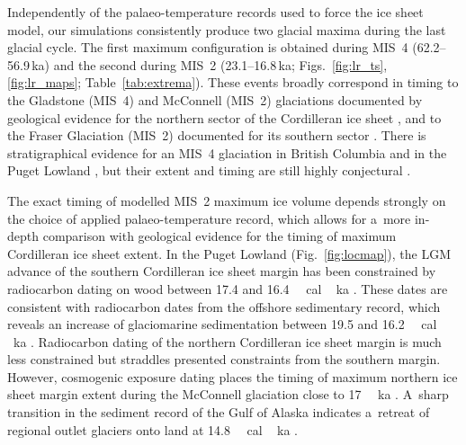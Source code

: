 \documentclass[tc, manuscript]{copernicus}
\begin{document}
      Independently of the palaeo-temperature records used to force the ice
      sheet model, our simulations consistently produce two glacial maxima
      during the last glacial cycle. The first maximum configuration is
      obtained during MIS~4 (62.2--56.9\,\unit{ka}) and the second during
      MIS~2 (23.1--16.8\,\unit{ka}; Figs.~\ref{fig:lr_ts},
      \ref{fig:lr_maps}; Table~\ref{tab:extrema}). These events broadly
      correspond in timing to the Gladstone (MIS~4) and McConnell (MIS~2)
      glaciations documented by geological evidence for the northern sector
      of the Cordilleran ice sheet \citep{Duk-Rodkin.etal.1996,
      Ward.etal.2007, Stroeven.etal.2010, Stroeven.etal.2014}, and to the
      Fraser Glaciation (MIS~2) documented for its southern sector
      \citep{Porter.Swanson.1998, Margold.etal.2014}. There is
      stratigraphical evidence for an MIS~4 glaciation in British Columbia
      \citep{Clague.Ward.2011} and in the Puget Lowland \citep{Troost.2014},
      but their extent and timing are still highly conjectural
      \citep[perhaps MIS~4 or early MIS~3; e.g.,][]{Cosma.etal.2008}.

      The exact timing of modelled MIS~2 maximum ice volume depends strongly
      on the choice of applied palaeo-temperature record, which allows for
      a~more in-depth comparison with geological evidence for the timing of
      maximum Cordilleran ice sheet extent. In the Puget Lowland
      (Fig.~\ref{fig:locmap}), the LGM advance of the southern Cordilleran
      ice sheet margin has been constrained by radiocarbon dating on wood
      between 17.4 and 16.4\,\unit{\,cal\,ka}
      \citep{Porter.Swanson.1998}. These dates are consistent with
      radiocarbon dates from the offshore sedimentary record, which reveals
      an increase of glaciomarine sedimentation between 19.5 and
      16.2\,\unit{\,cal\,ka} \citep{Cosma.etal.2008,
      Taylor.etal.2014}. Radiocarbon dating of the northern Cordilleran ice
      sheet margin is much less constrained but straddles presented
      constraints from the southern margin. However, cosmogenic exposure
      dating places the timing of maximum northern ice sheet margin extent
      during the McConnell
      glaciation close to 17\,\unit{\,ka}
      \citep{Stroeven.etal.2010, Stroeven.etal.2014}. A~sharp transition in
      the sediment record of the Gulf of Alaska indicates a~retreat of
      regional outlet glaciers onto land at
      14.8\,\unit{\,cal\,ka} \citep{Davies.etal.2011}.
\end{document}

